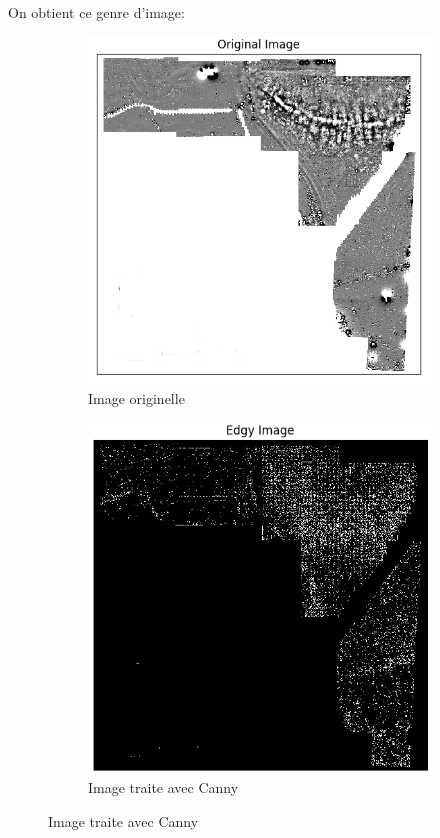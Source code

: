\documentclass[a4paper, 12pt, titlepage, oneside]{article}
\begin{document}
	\newpage
	On obtient ce genre d'image:\\
	\begin{figure}[!h]
		\centering
		\begin{subfigure}[b]{0.4\linewidth}
			\includegraphics[width=\linewidth]{Canny1a.png}
			\caption{Image originelle}
		\end{subfigure}
		\begin{subfigure}[b]{0.4\linewidth}
			\includegraphics[width=\linewidth]{Canny1b.png}
			\caption{Image traite avec Canny}
		\end{subfigure}
		\label{fig:canny}
	\end{figure}
	
\end{document}
